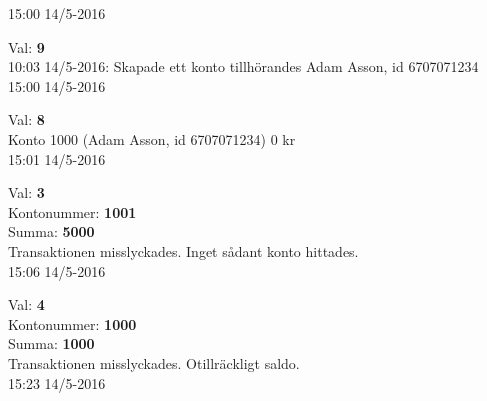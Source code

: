 \begin{multicols}{2}
\begin{exampleblock}
15:00 14/5-2016\\
\end{exampleblock}
\begin{exampleblock}
Val: \textbf{9}\\
10:03 14/5-2016: Skapade ett konto tillhörandes Adam Asson, id 6707071234\\
15:00 14/5-2016\\
\end{exampleblock}
\begin{exampleblock}
Val: \textbf{8}\\
Konto 1000 (Adam Asson, id 6707071234) 0 kr\\
15:01 14/5-2016\\
\end{exampleblock}
\begin{exampleblock}
Val: \textbf{3}\\
Kontonummer: \textbf{1001}\\
Summa: \textbf{5000}\\
Transaktionen misslyckades. Inget sådant konto hittades.\\
15:06 14/5-2016\\
\end{exampleblock}
\begin{exampleblock}
Val: \textbf{4}\\
Kontonummer: \textbf{1000}\\
Summa: \textbf{1000}\\
Transaktionen misslyckades. Otillräckligt saldo.\\
15:23 14/5-2016\\
\end{exampleblock}

\end{multicols}
